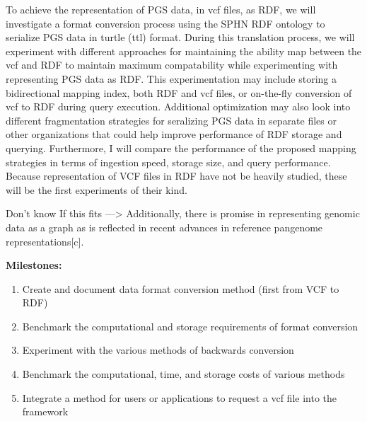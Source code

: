 \documentclass[a4paper,11pt]{article}
\begin{document}
To achieve the representation of PGS data, in vcf files, as RDF, we will investigate a format conversion process using the SPHN RDF ontology to serialize PGS data in turtle (ttl) format. 
During this translation process, we will experiment with different approaches for maintaining the ability map between the vcf and RDF to maintain maximum compatability while experimenting with representing PGS data as RDF. 
This experimentation may include storing a bidirectional mapping index, both RDF and vcf files, or on-the-fly conversion of vcf to RDF during query execution. 
Additional optimization may also look into different fragmentation strategies for seralizing PGS data in separate files or other organizations that could help improve performance of RDF storage and querying.
Furthermore, I will compare the performance of the proposed mapping strategies in terms of ingestion speed, storage size, and query performance. 
Because representation of VCF files in RDF have not be heavily studied, these will be the first experiments of their kind.


Don't know If this fits --->
Additionally, there is promise in representing genomic data as a graph as is reflected in recent advances in reference pangenome representations[c]. 

\textbf{Milestones:} 
\begin{enumerate}
	\item Create and document data format conversion method (first from VCF to RDF)
	\item Benchmark the computational and storage requirements of format conversion
	\item Experiment with the various methods of backwards conversion
	\item Benchmark the computational, time, and storage costs of various methods
	\item Integrate a method for users or applications to request a vcf file into the framework
\end{enumerate}
\end{document}
